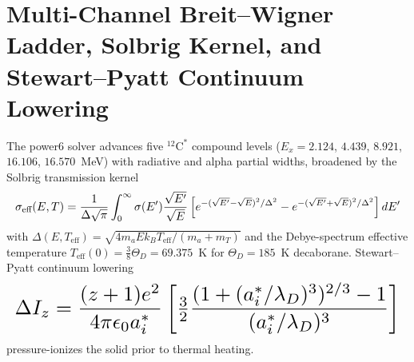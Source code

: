 \section{Multi-Channel Breit--Wigner Ladder, Solbrig Kernel, and
Stewart--Pyatt Continuum Lowering}
The power6 solver advances five $^{12}\mathrm{C}^*$ compound levels
($E_x = 2.124$, $4.439$, $8.921$, $16.106$, $16.570$~MeV) with radiative
and alpha partial widths, broadened by the Solbrig transmission kernel
\begin{equation}
\resizebox{\columnwidth}{!}{$\displaystyle
\sigma_{\text{eff}}(E,T) = \frac{1}{\Delta\sqrt{\pi}}
\int_0^\infty \sigma(E')\frac{\sqrt{E'}}{\sqrt{E}}
\left[e^{-(\sqrt{E'}-\sqrt{E})^2/\Delta^2}
- e^{-(\sqrt{E'}+\sqrt{E})^2/\Delta^2}\right]dE'
$}
\end{equation}
with $\Delta(E,T_{\text{eff}}) = \sqrt{4m_aEk_BT_{\text{eff}}/(m_a+m_T)}$
and the Debye-spectrum effective temperature $T_{\text{eff}}(0) =
\tfrac{3}{8}\Theta_D = 69.375$~K for $\Theta_D = 185$~K decaborane.
Stewart--Pyatt continuum lowering
\begin{equation}
\resizebox{\columnwidth}{!}{$\displaystyle
\Delta I_z = \frac{(z+1)e^2}{4\pi\epsilon_0 a_i^*}
\left[\tfrac{3}{2}\frac{(1+(a_i^*/\lambda_D)^3)^{2/3}-1}
{(a_i^*/\lambda_D)^3}\right]
$}
\end{equation}
pressure-ionizes the solid prior to thermal heating.
